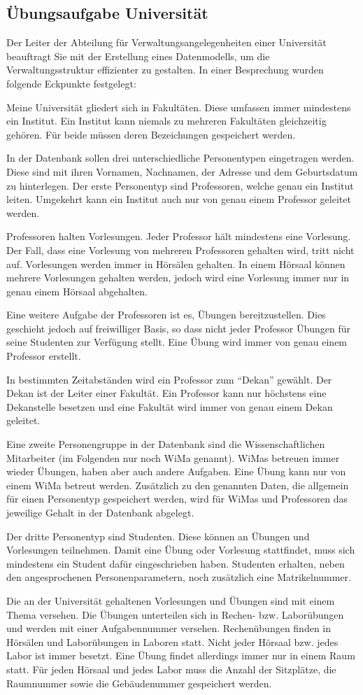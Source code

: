 \subsection{Übungsaufgabe Universität}
Der Leiter der Abteilung für Verwaltungsangelegenheiten einer
Universität beauftragt Sie mit der Erstellung eines Datenmodells, um
die Verwaltungsstruktur effizienter zu gestalten. In einer Besprechung
wurden folgende Eckpunkte festgelegt:

Meine Universität gliedert sich in Fakultäten. Diese umfassen immer
mindestens ein Institut. Ein Institut kann niemals zu mehreren
Fakultäten gleichzeitig gehören. Für beide müssen deren
Bezeichungen gespeichert werden.

In der Datenbank sollen drei unterschiedliche Personentypen eingetragen
werden. Diese sind mit ihren Vornamen, Nachnamen, der Adresse und dem
Geburtsdatum zu hinterlegen. Der erste Personentyp sind Professoren,
welche genau ein Institut leiten. Umgekehrt kann ein Institut auch nur
von genau einem Professor geleitet werden.

Professoren halten Vorlesungen. Jeder Professor hält mindestens eine
Vorlesung. Der Fall, dass eine Vorlesung von mehreren Professoren
gehalten wird, tritt nicht auf. Vorlesungen werden immer in
Hörsälen gehalten. In einem Hörsaal können mehrere Vorlesungen
gehalten werden, jedoch wird eine Vorlesung immer nur in genau einem
Hörsaal abgehalten.

Eine weitere Aufgabe der Professoren ist es, Übungen bereitzustellen.
Dies geschieht jedoch auf freiwilliger Basis, so dass nicht jeder
Professor Übungen für seine Studenten zur Verfügung stellt. Eine
Übung wird immer von genau einem Professor erstellt.

In bestimmten Zeitabständen wird ein Professor zum \enquote{Dekan}
gewählt. Der Dekan ist der Leiter einer Fakultät. Ein Professor kann
nur höchstens eine Dekanstelle besetzen und eine Fakultät wird immer
von genau einem Dekan geleitet.

Eine zweite Personengruppe in der Datenbank sind die Wissenschaftlichen
Mitarbeiter (im Folgenden nur noch WiMa genannt). WiMas betreuen immer
wieder Übungen, haben aber auch andere Aufgaben. Eine Übung kann nur
von einem WiMa betreut werden. Zusätzlich zu den genannten Daten, die
allgemein für einen Personentyp gespeichert werden, wird für WiMas
und Professoren das jeweilige Gehalt in der Datenbank abgelegt.

Der dritte Personentyp sind Studenten. Diese können an Übungen und
Vorlesungen teilnehmen. Damit eine Übung oder Vorlesung stattfindet,
muss sich mindestens ein Student dafür eingeschrieben haben. Studenten
erhalten, neben den angesprochenen Personenparametern, noch zusätzlich
eine Matrikelnummer.

Die an der Universität gehaltenen Vorlesungen und Übungen sind mit
einem Thema versehen. Die Übungen unterteilen sich in Rechen- bzw.
Laborübungen und werden mit einer Aufgabennummer versehen.
Rechenübungen finden in Hörsälen und Laborübungen in Laboren
statt. Nicht jeder Hörsaal bzw. jedes Labor ist immer besetzt. Eine
Übung findet allerdings immer nur in einem Raum statt. Für jeden
Hörsaal und jedes Labor muss die Anzahl der Sitzplätze, die
Raumnummer sowie die Gebäudenummer gespeichert werden.
\clearpage